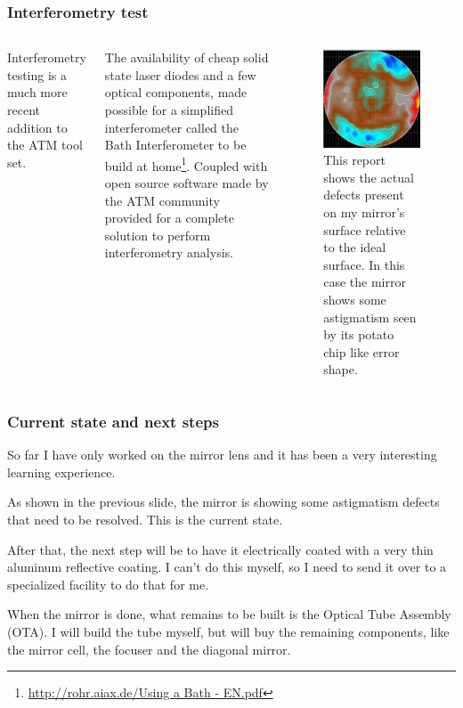 \documentclass{beamer}
\begin{document}
\begin{frame}
\frametitle{Interferometry test}
\begin{columns}
Interferometry testing is a much more recent addition to the ATM tool set.

The availability of cheap solid state laser diodes and a few optical components, made possible for a simplified interferometer called the Bath Interferometer to be build at home\footnote[frame]{\url{http://rohr.aiax.de/Using a Bath - EN.pdf}}. Coupled with open source software made by the ATM community provided for a complete solution to perform interferometry analysis.
\begin{figure}
\includegraphics[scale=0.3]{assets/bath.jpg}
\caption{This report shows the actual defects present on my mirror's surface relative to the ideal surface. In this case the mirror shows some astigmatism seen by its potato chip like error shape.}
\end{figure}
\end{columns}
\end{frame}


\begin{frame}
\frametitle{Current state and next steps}
So far I have only worked on the mirror lens and it has been a very interesting learning experience.

As shown in the previous slide, the mirror is showing some astigmatism defects that need to be resolved. This is the current state.

After that, the next step will be to have it electrically coated with a very thin aluminum reflective coating. I can't do this myself, so I need to send it over to a specialized facility to do that for me.

When the mirror is done, what remains to be built is the Optical Tube Assembly (OTA). I will build the tube myself, but will buy the remaining components, like the mirror cell, the focuser and the diagonal mirror.
\end{frame}
\end{document}
